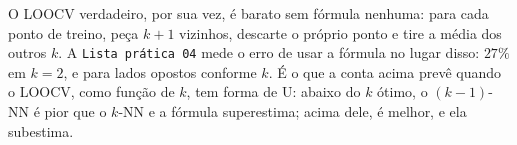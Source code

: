 \documentclass[11pt,a4paper]{article}
\begin{document}
\begin{solucao}
O LOOCV verdadeiro, por sua vez, é barato sem fórmula nenhuma: para cada ponto de
treino, peça $k+1$ vizinhos, descarte o próprio ponto e tire a média dos outros $k$.
A \texttt{Lista prática 04} mede o erro de usar a fórmula no lugar disso: $27\%$ em
$k=2$, e para lados opostos conforme $k$. É o que a conta acima prevê quando o LOOCV,
como função de $k$, tem forma de U: abaixo do $k$ ótimo, o $(k-1)$-NN é pior que o
$k$-NN e a fórmula superestima; acima dele, é melhor, e ela subestima.
\end{solucao}
\end{document}
